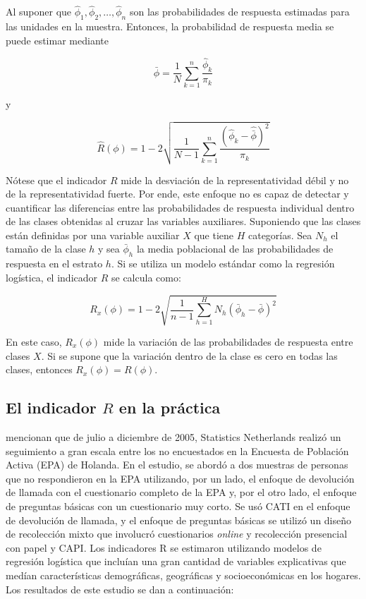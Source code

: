 \documentclass[
  12pt,
]{book}
\begin{document}
Al suponer que \(\hat{\phi}_{1},\hat{\phi}_{2},\ldots,\hat{\phi}_{n}\) son
las probabilidades de respuesta estimadas para las unidades en la muestra.
Entonces, la probabilidad de respuesta media se puede estimar mediante

\[
\hat{\bar{\phi}}  =  \frac{1}{N}\sum_{k=1}^{n}\frac{\hat{\phi}_{k}}{\pi_{k}}
\]

y

\[
\hat{R}\left(\phi\right)  =  1-2\sqrt{\frac{1}{N-1}\sum_{k=1}^{n}\frac{\left(\hat{\phi}_{k}-\hat{\bar{\phi}}\right)^{2}}{\pi_{k}}}
\]

Nótese que el indicador \(R\) mide la desviación de la representatividad débil y no de la representatividad fuerte. Por ende, este enfoque no es capaz de detectar y cuantificar las diferencias
entre las probabilidades de respuesta individual dentro de las clases obtenidas al cruzar las variables auxiliares. Suponiendo que las clases están definidas por una variable auxiliar \(X\) que tiene \(H\) categorías. Sea \(N_{h}\) el tamaño de la clase \(h\) y sea \(\bar{\phi}_{h}\) la media poblacional de las probabilidades de respuesta en el estrato \(h\). Si se utiliza un modelo estándar como la regresión logística, el indicador \(R\) se calcula como:

\[
R_{x}\left(\phi\right)  =  1-2\sqrt{\frac{1}{n-1}\sum_{h=1}^{H}N_{h}\left(\bar{\phi}_{h}-\bar{\phi}\right)^{2}}
\]

En este caso, \(R_{x}\left(\phi\right)\) mide la variación de las probabilidades de respuesta entre clases \(X\). Si se supone que la variación dentro de la clase es cero en todas las clases, entonces \(R_{x}\left(\phi\right) = R\left(\phi\right)\).

\hypertarget{el-indicador-r-en-la-pruxe1ctica}{%
\subsection{\texorpdfstring{El indicador \(R\) en la práctica}{El indicador R en la práctica}}\label{el-indicador-r-en-la-pruxe1ctica}}

\citet{Bethlehem_Cobben_Schouten_2009} mencionan que de julio a diciembre de 2005, Statistics Netherlands realizó un seguimiento a gran escala entre los no encuestados en la Encuesta de Población Activa (EPA) de Holanda. En el estudio, se abordó a dos muestras de personas que no respondieron en la EPA utilizando, por un lado, el enfoque de devolución de llamada con el cuestionario completo de la EPA y, por el otro lado, el enfoque de preguntas básicas con un cuestionario muy corto. Se usó CATI en el enfoque de devolución de llamada, y el enfoque de preguntas básicas se utilizó un diseño de recolección mixto que involucró cuestionarios \emph{online} y recolección presencial con papel y CAPI. Los indicadores R se estimaron utilizando modelos de regresión logística que incluían una gran cantidad de variables explicativas que medían características demográficas, geográficas y socioeconómicas en los hogares. Los resultados de este estudio se dan a continuación:
\end{document}
